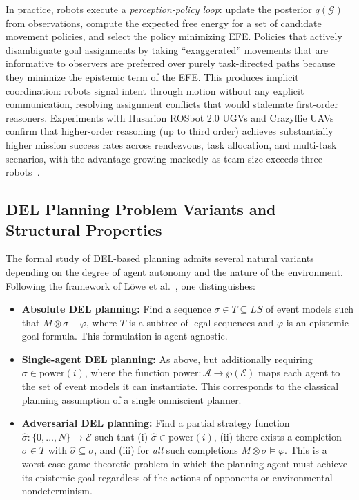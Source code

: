 \documentclass[12pt,a4paper]{article}
\theoremstyle{definition}
\theoremstyle{plain}
\begin{document}
In practice, robots execute a \textit{perception-policy loop}: update the posterior
$q(\mathcal{G})$ from observations, compute the expected free energy for a set of
candidate movement policies, and select the policy minimizing EFE. Policies that actively
disambiguate goal assignments by taking ``exaggerated'' movements that are informative to
observers are preferred over purely task-directed paths because they minimize the epistemic
term of the EFE. This produces implicit coordination: robots signal intent through motion
without any explicit communication, resolving assignment conflicts that would stalemate
first-order reasoners. Experiments with Husarion ROSbot 2.0 UGVs and Crazyflie UAVs
confirm that higher-order reasoning (up to third order) achieves substantially higher
mission success rates across rendezvous, task allocation, and multi-task scenarios, with
the advantage growing markedly as team size exceeds three robots~\cite{bramblett2025active}.

\subsection{DEL Planning Problem Variants and Structural Properties}
\label{subsec:del_planning_variants}

The formal study of DEL-based planning admits several natural variants depending on the
degree of agent autonomy and the nature of the environment. Following the framework
of L{\"o}we et al.~\cite{lowe2010planning}, one distinguishes:

\begin{itemize}[noitemsep]
\item \textbf{Absolute DEL planning:} Find a sequence $\sigma \in T \subseteq LS$ of
event models such that $M \otimes \sigma \models \varphi$, where $T$ is a subtree of
legal sequences and $\varphi$ is an epistemic goal formula. This formulation is
agent-agnostic.

\item \textbf{Single-agent DEL planning:} As above, but additionally requiring
$\sigma \in \mathrm{power}(i)$, where the function $\mathrm{power} : \mathcal{A}
\to \wp(\mathcal{E})$ maps each agent to the set of event models it can instantiate.
This corresponds to the classical planning assumption of a single omniscient planner.

\item \textbf{Adversarial DEL planning:} Find a partial strategy function
$\hat{\sigma} : \{0, \ldots, N\} \to \mathcal{E}$ such that (i) $\hat{\sigma} \in
\mathrm{power}(i)$, (ii) there exists a completion $\sigma \in T$ with
$\hat{\sigma} \subseteq \sigma$, and (iii) for \textit{all} such completions
$M \otimes \sigma \models \varphi$. This is a worst-case game-theoretic problem in
which the planning agent must achieve its epistemic goal regardless of the actions
of opponents or environmental nondeterminism.
\end{itemize}
\end{document}
